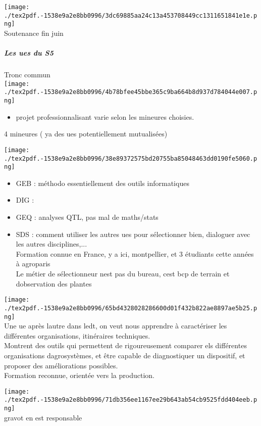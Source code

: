\documentclass[
]{article}
\providecommand{\tightlist}{%
  \setlength{\itemsep}{0pt}\setlength{\parskip}{0pt}}
\begin{document}
\texttt{[image: ./tex2pdf.-1538e9a2e8bb0996/3dc69885aa24c13a453708449cc1311651841e1e.png]}\\
Soutenance fin juin

\hypertarget{les-ues-du-s5}{%
\subparagraph{Les ues du S5}\label{les-ues-du-s5}}

Tronc commun\\
\texttt{[image: ./tex2pdf.-1538e9a2e8bb0996/4b78bfee45bbe365c9ba664b8d937d784044e007.png]}

\begin{itemize}
\tightlist
\item
  projet professionnalisant varie selon les mineures choisies.
\end{itemize}

4 mineures ( ya des ues potentiellement mutualisées)

\texttt{[image: ./tex2pdf.-1538e9a2e8bb0996/38e89372575bd20755ba85048463dd0190fe5060.png]}

\begin{itemize}
\tightlist
\item
  GEB : méthodo essentiellement des outils informatiques
\item
  DIG :
\item
  GEQ : analyses QTL, pas mal de maths/stats
\item
  SDS : comment utiliser les autres ues pour sélectionner bien,
  dialoguer avec les autres disciplines,...\\
  Formation connue en France, y a ici, montpellier, et 3 étudiants cette
  années à agroparis\\
  Le métier de sélectionneur n\textquotesingle est pas du bureau,
  c\textquotesingle est bcp de terrain et d\textquotesingle observation
  des plantes
\end{itemize}

\texttt{[image: ./tex2pdf.-1538e9a2e8bb0996/65bd4328028286600d01f432b822ae8897ae5b25.png]}\\
Une ue après l\textquotesingle autre dans l\textquotesingle edt, on veut
nous apprendre à caractériser les différentes organisations, itinéraires
techniques.\\
Montrent des outils qui permettent de rigoureusement comparer els
différentes organisations d\textquotesingle agrosystèmes, et être
capable de diagnostiquer un dispositif, et proposer des améliorations
possibles.\\
Formation reconnue, orientée vers la production.

\texttt{[image: ./tex2pdf.-1538e9a2e8bb0996/71db356ee1167ee29b643ab54cb9525fdd404eeb.png]}\\
gravot en est responsable
\end{document}
